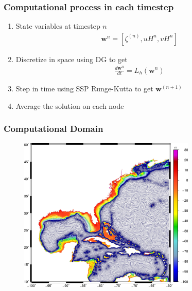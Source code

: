 \documentclass[10pt]{oden_beamer}
\newcommand\Dt[1]{\frac{d #1}{dt}}
\begin{document}
\begin{frame}
  \frametitle{Computational process in each timestep}
  \begin{enumerate}
  \item  State variables at timestep $n$
    \begin{align}
      \mathbf{w}^n = [\zeta^{(n)}, uH^n, vH^n]
    \end{align}
  \item Discretize in space using DG to get
    \begin{align}
        \Dt{\mathbf{w}^n} = L_h(\mathbf{w}^n)
    \end{align}
  \item Step in time using SSP Runge-Kutta to get
      $\mathbf{w}^{(n+1)}$
  \item Average the solution on each node
  \end{enumerate}
\end{frame}
\begin{frame}
  \frametitle{Computational Domain}
  \begin{figure}[t]
    \centering
    \includegraphics[width=0.75\textwidth]{120m_bath.jpg}
  \end{figure}
\end{frame}
\end{document}
